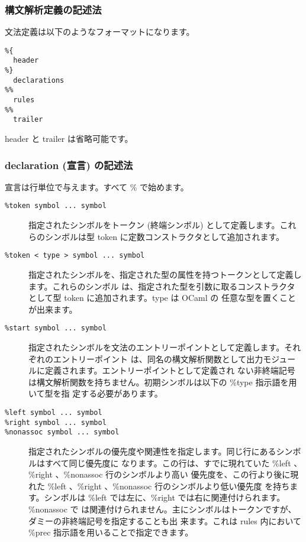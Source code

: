 \documentclass[a4paper,11pt]{jsarticle}
\begin{document}
\subsubsection{構文解析定義の記述法}

文法定義は以下のようなフォーマットになります。

\begin{lstlisting}
%{
  header
%}
  declarations
%%
  rules
%%
  trailer
\end{lstlisting}

header と trailer は省略可能です。

\subsubsection{declaration (宣言) の記述法}

宣言は行単位で与えます。すべて \% で始めます。

\begin{description}
\item [\texttt{\%token symbol ...  symbol}]
  指定されたシンボルをトークン (終端シンボル) として定義します。これらのシンボルは型 token
  に定数コンストラクタとして追加されます。
\item [\texttt{\%token < type >  symbol ...  symbol}]
  指定されたシンボルを、指定された型の属性を持つトークンとして定義します。これらのシンボル
  は、指定された型を引数に取るコンストラクタとして型 token に追加されます。type は OCaml の
  任意な型を置くことが出来ます。
\item[\texttt{\%start symbol ...  symbol}]
  指定されたシンボルを文法のエントリーポイントとして定義します。それぞれのエントリーポイント
  は、同名の構文解析関数として出力モジュールに定義されます。エントリーポイントとして定義され
  ない非終端記号は構文解析関数を持ちません。初期シンボルは以下の \%type 指示語を用いて型を指
  定する必要があります。
\item[\texttt{\%left symbol ...  symbol}]
\item[\texttt{\%right symbol ...  symbol}]
\item[\texttt{\%nonassoc symbol ...  symbol}]
  指定されたシンボルの優先度や関連性を指定します。同じ行にあるシンボルはすべて同じ優先度に
  なります。この行は、すでに現れていた \%left 、\%right 、\%nonassoc 行のシンボルより高い
  優先度を、この行より後に現れた \%left 、\%right 、\%nonassoc 行のシンボルより低い優先度
  を持ちます。シンボルは \%left では左に、\%right では右に関連付けられます。\%nonassoc で
  は関連付けられません。主にシンボルはトークンですが、ダミーの非終端記号を指定することも出
  来ます。これは rules 内において \%prec 指示語を用いることで指定できます。
\end{description}
\end{document}

